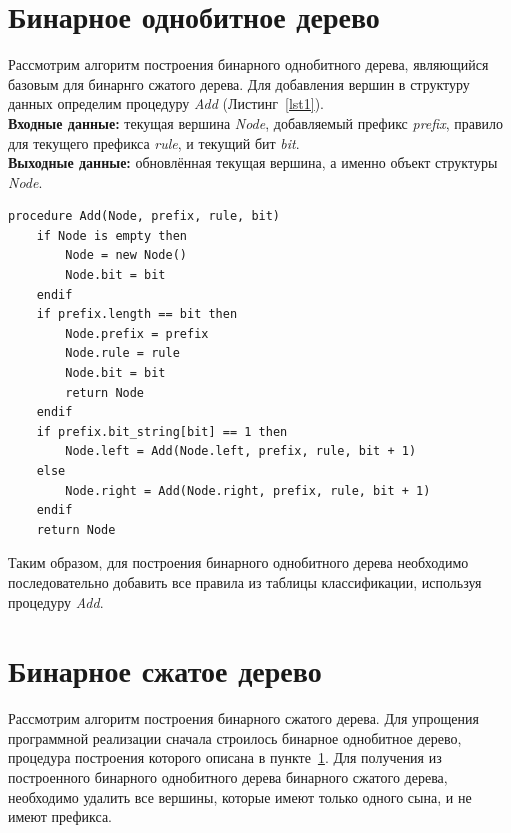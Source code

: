 \documentclass[a4paper, 12pt, titlepage, finall]{extreport}
\begin{document}
        \section{Бинарное однобитное дерево}
        \label{section:binone}
            Рассмотрим алгоритм построения бинарного однобитного дерева, являющийся базовым для бинарнго сжатого дерева.
            Для добавления вершин в структуру данных определим процедуру \emph{Add} (Листинг~\ref{lst1}).\\
            {\bf Входные данные:} текущая вершина \emph{Node}, добавляемый префикс \emph{prefix}, правило для текущего префикса \emph{rule}, и текущий бит \emph{bit}.\\
            {\bf Выходные данные:} обновлённая текущая вершина, а именно объект структуры \emph{Node}.
\\
\begin{lstlisting}[frame=lines, caption=Процедура добавления вершины в бинарное однобитное дерево., label=lst1]
procedure Add(Node, prefix, rule, bit)
    if Node is empty then
        Node = new Node()
        Node.bit = bit
    endif
    if prefix.length == bit then
        Node.prefix = prefix
        Node.rule = rule
        Node.bit = bit
        return Node
    endif
    if prefix.bit_string[bit] == 1 then
        Node.left = Add(Node.left, prefix, rule, bit + 1)
    else
        Node.right = Add(Node.right, prefix, rule, bit + 1)
    endif
    return Node
\end{lstlisting}
\vspace{1em}
            Таким образом, для построения бинарного однобитного дерева необходимо последовательно добавить все правила из таблицы классификации,
            используя процедуру \emph{Add}.

        \section{Бинарное сжатое дерево}
            Рассмотрим алгоритм построения бинарного сжатого дерева. Для упрощения программной реализации сначала строилось бинарное однобитное дерево,
            процедура построения которого описана в пункте~\ref{section:binone}. Для получения из построенного бинарного однобитного дерева бинарного сжатого дерева,
            необходимо удалить все вершины, которые имеют только одного сына, и не имеют префикса.
\end{document}

